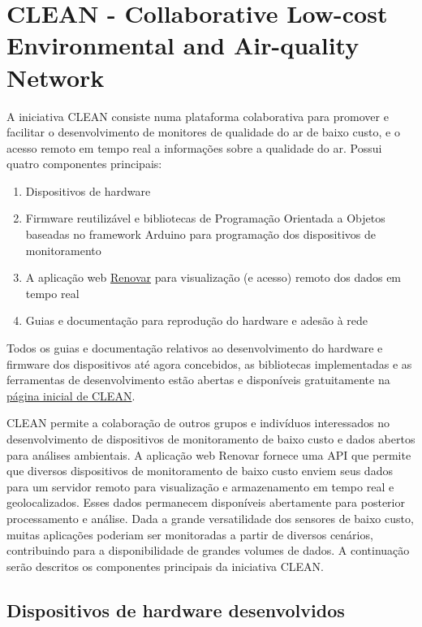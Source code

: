 \chapter{CLEAN - Collaborative Low-cost Environmental and Air-quality Network}\label{cap:clean-initiative}
A iniciativa CLEAN consiste numa plataforma colaborativa para promover e facilitar o desenvolvimento de monitores de qualidade do ar de baixo custo, e o acesso remoto em tempo real a informações sobre a qualidade do ar. Possui quatro componentes principais: 

\begin{enumerate}
    \item Dispositivos de hardware
    \item Firmware reutilizável e bibliotecas de Programação Orientada a Objetos baseadas no framework Arduino para programação dos dispositivos de monitoramento
    \item A aplicação web \href{http://renovar.lcqar.ufsc.br/}{Renovar} para visualização (e acesso) remoto dos dados em tempo real
    \item Guias e documentação para reprodução do hardware e adesão à rede
\end{enumerate}

Todos os guias e documentação relativos ao desenvolvimento do hardware e firmware dos dispositivos até agora concebidos, as bibliotecas implementadas e as ferramentas de desenvolvimento estão abertas e disponíveis gratuitamente na \href{https://lcqar.ufsc.br/novo/index.php/documentacao-clean/}{página inicial de CLEAN}.

CLEAN permite a colaboração de outros grupos e indivíduos interessados no desenvolvimento de dispositivos de monitoramento de baixo custo e dados abertos para análises ambientais. A aplicação web Renovar fornece uma API que permite que diversos dispositivos de monitoramento de baixo custo enviem seus dados para um servidor remoto para visualização e armazenamento em tempo real e geolocalizados. Esses dados permanecem disponíveis abertamente para posterior processamento e análise. Dada a grande versatilidade dos sensores de baixo custo, muitas aplicações poderiam ser monitoradas a partir de diversos cenários, contribuindo para a disponibilidade de grandes volumes de dados. A continuação serão descritos os componentes principais da iniciativa CLEAN.

\section{Dispositivos de hardware desenvolvidos}

